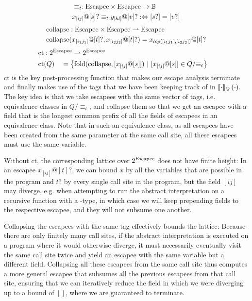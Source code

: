 \begin{alignat*}{1}
	&\equiv_t : \mathrm{Escapee} \times \mathrm{Escapee} \to \mathbb{B} \\
	&x_{[ij]} @ [s]? \equiv_t y_{[kl]} @ [v]? :\Leftrightarrow [s?] = [v?]
\end{alignat*}
\begin{align*}
	\mathrm{collapse} &: \mathrm{Escapee} \times \mathrm{Escapee} \rightharpoonup \mathrm{Escapee} \\
	\mathrm{collapse}&(x_{[i_1j_1]} @ [t]?, x_{[i_2j_2]} @ [t]?) = x_{lcp([i_1j_1], [i_2j_2])} @ [t]?
\end{align*}
\begin{alignat*}{3}
	\ct &: \mathrlap{2^{\Escapee} \rightharpoonup 2^{\Escapee}} \\
	\ct&(Q) &&= \left\{\mathrm{fold}(\collapse, [x_{[ij]} @ [s]])\ |\ [x_{[ij]} @ [s]] \in Q/{\equiv_t} \right\}
\end{alignat*}
ct is the key post-processing function that makes our escape analysis terminate and finally makes use of the tags that we have been keeping track of in $\llbracket {\cdot} \rrbracket_Q \left( {\cdot} \right)$. The key idea is that we take escapees with the same vector of tags, i.e. equivalence classes in $Q/{\equiv_t}$, and collapse them so that we get an escapee with a field that is the longest common prefix of all the fields of escapees in an equivalence class. Note that in such an equivalence class, as all escapees have been created from the same parameter at the same call site, all these escapees must use the same variable.

Without ct, the corresponding lattice over $2^{\mathrm{Escapee}}$ does not have finite height: In an escapee $x_{[ij]} @ [t]?$, we can bound $x$ by all the variables that are possible in the program and $t?$ by every single call site in the program, but the field $[ij]$ may diverge, e.g. when attempting to run the abstract interpretation on a recursive function with a -type, in which case we will keep prepending fields to the respective escapee, and they will not subsume one another. 

Collapsing the escapees with the same tag effectively bounds the lattice: Because there are only finitely many call sites, if the abstract interpretation is executed on a program where it would otherwise diverge, it must necessarily eventually visit the same call site twice and yield an escapee with the same variable but a different field. Collapsing all these escapees from the same call site thus computes a more general escapee that subsumes all the previous escapees from that call site, ensuring that we can iteratively reduce the field in which we were diverging up to a bound of $[]$, where we are guaranteed to terminate.

